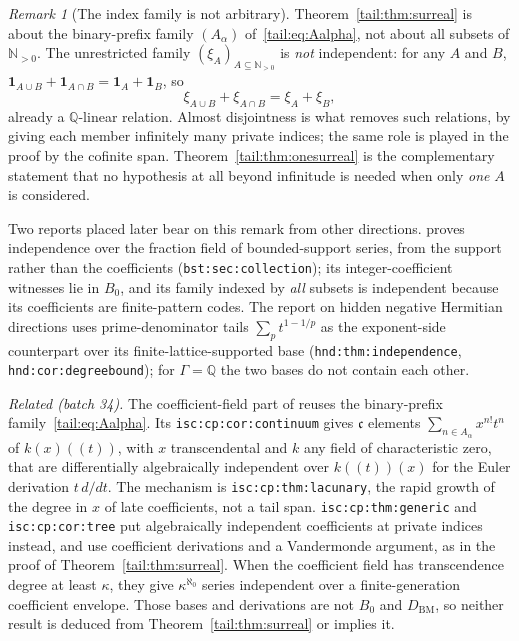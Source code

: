 \documentclass[11pt,a4paper]{article}
\numberwithin{equation}{section}
\theoremstyle{definition}
\theoremstyle{remark}
\newtheorem{remark}[theorem]{Remark}
\newcommand{\Q}{\mathbb Q}
\newcommand{\N}{\mathbb N}
\newcommand{\BM}{D_{\mathrm{BM}}}
\newcommand{\cf}{\mathfrak c}
\begin{document}
\begin{remark}[The index family is not arbitrary]
\label{tail:rem:indexfamily}
Theorem~\ref{tail:thm:surreal} is about the binary-prefix family
$(A_\alpha)$ of~\eqref{tail:eq:Aalpha}, not about all subsets of
$\N_{>0}$. The unrestricted family $(\xi_A)_{A\subseteq\N_{>0}}$ is
\emph{not} independent: for any $A$ and $B$,
$\mathbf1_{A\cup B}+\mathbf1_{A\cap B}=\mathbf1_A+\mathbf1_B$, so
\[
 \xi_{A\cup B}+\xi_{A\cap B}=\xi_A+\xi_B ,
\]
already a $\Q$-linear relation. Almost disjointness is what removes such
relations, by giving each member infinitely many private indices; the same
role is played in the proof by the cofinite span. Theorem~\ref{tail:thm:onesurreal}
is the complementary statement that no hypothesis at all beyond infinitude
is needed when only \emph{one} $A$ is considered.
\end{remark}

Two reports placed later bear on this remark from other directions.
 proves independence
over the fraction field of bounded-support series, from the support rather
than the coefficients (\texttt{bst:sec:collection}); its integer-coefficient
witnesses lie in $B_0$, and its family indexed by \emph{all} subsets is
independent because its coefficients are finite-pattern codes.
The report on hidden negative Hermitian directions uses
prime-denominator tails $\sum_pt^{1-1/p}$ as the exponent-side counterpart
over its finite-lattice-supported base (\texttt{hnd:thm:independence},
\texttt{hnd:cor:degreebound}); for $\Gamma=\Q$ the two bases do not contain
each other.

\emph{Related (batch 34).} The coefficient-field part of
 reuses the binary-prefix
family~\eqref{tail:eq:Aalpha}. Its \texttt{isc:cp:cor:continuum} gives $\cf$
elements $\sum_{n\in A_\alpha}x^{n!}t^n$ of $k(x)((t))$, with $x$
transcendental and $k$ any field of characteristic zero, that are
differentially algebraically independent over $k((t))(x)$ for the Euler
derivation $t\,d/dt$. The mechanism is \texttt{isc:cp:thm:lacunary}, the
rapid growth of the degree in $x$ of late coefficients, not a tail span.
\texttt{isc:cp:thm:generic} and \texttt{isc:cp:cor:tree} put algebraically
independent coefficients at private indices instead, and use coefficient
derivations and a Vandermonde argument, as in the proof of
Theorem~\ref{tail:thm:surreal}. When the coefficient field has transcendence
degree at least $\kappa$, they give $\kappa^{\aleph_0}$ series independent
over a finite-generation coefficient envelope. Those bases and derivations
are not $B_0$ and $\BM$, so neither result is deduced from
Theorem~\ref{tail:thm:surreal} or implies it.
\end{document}
